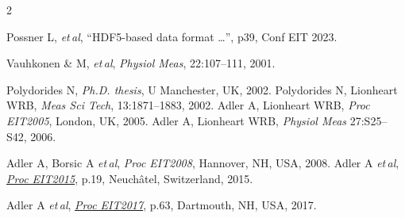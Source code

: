 \documentclass[10pt,a4paper]{article}
\renewenvironment{thebibliography}[1]{%
    \begin{oldthebibliography}{#1}%
      \setlength{\parskip}{0ex}%
      \setlength{\itemsep}{0ex}%
  }%
  {%
    \end{oldthebibliography}%
  }
\begin{document}
\begin{multicols}{2}
\begin{thebibliography}{}
   Possner L, \emph{et\,al}, 
``HDF5-based data format \ldots'',
p39, Conf EIT 2023.



   Vauhkonen \& M,  {\em  et\,al},
   {\em  Physiol Meas}, 22:107--111, 2001.

   Polydorides N,
 {\em Ph.D. thesis}, U Manchester, UK, 2002.
   Polydorides N, Lionheart WRB,
   {\em Meas Sci Tech}, 13:1871--1883, 2002.
Adler A, Lionheart WRB,
{\em Proc EIT2005}, London, UK, 2005.
%
Adler A, Lionheart WRB,
{\em Physiol Meas} 27:S25--S42, 2006.

Adler A, Borsic A {\em et\,al},
{\em Proc EIT2008}, Hannover, NH, USA, 2008.
Adler A {\em et\,al}, %
\href{https://zenodo.org/record/17752}{\em Proc EIT2015}, p.19, 
 Neuchâtel, Switzerland, 2015.

Adler A {\em et\,al}, %
\href{https://zenodo.org/record/557093}{\em Proc EIT2017}, p.63, 
Dartmouth, NH, USA,  2017.
\end{thebibliography}
\end{multicols}
\end{document}
